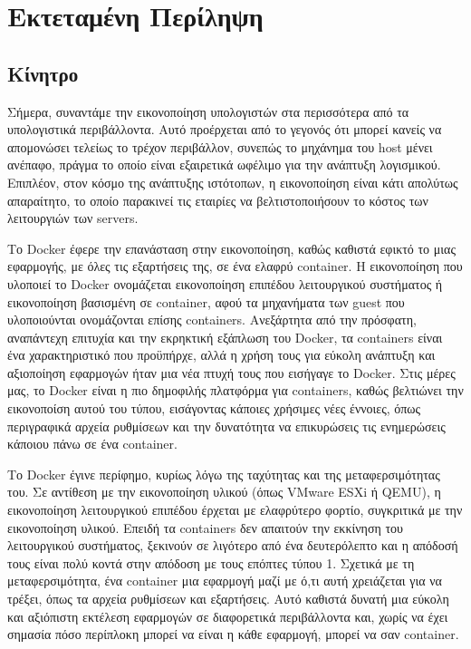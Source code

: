 \chapter*{Εκτεταμένη Περίληψη}
\section*{Κίνητρο}

Σήμερα, συναντάμε την εικονοποίηση υπολογιστών στα περισσότερα από τα υπολογιστικά περιβάλλοντα. Αυτό προέρχεται από το γεγονός ότι μπορεί κανείς να απομονώσει τελείως το τρέχον περιβάλλον, συνεπώς το μηχάνημα του \en host\gr{} μένει ανέπαφο, πράγμα το οποίο είναι εξαιρετικά ωφέλιμο για την ανάπτυξη λογισμικού. Επιπλέον, στον κόσμο της ανάπτυξης ιστότοπων, η εικονοποίηση είναι κάτι απολύτως απαραίτητο, το οποίο παρακινεί τις εταιρίες να βελτιστοποιήσουν το κόστος των λειτουργιών των \en servers\gr{}.

Το \en Docker\gr{} έφερε την επανάσταση στην εικονοποίηση, καθώς καθιστά εφικτό το  μιας εφαρμογής, με όλες τις εξαρτήσεις της, σε ένα ελαφρύ \en container\gr{}. Η εικονοποίηση που υλοποιεί το \en Docker\gr{} ονομάζεται εικονοποίηση επιπέδου λειτουργικού συστήματος ή εικονοποίηση βασισμένη σε \en container\gr{}, αφού τα μηχανήματα των \en guest\gr{} που υλοποιούνται ονομάζονται επίσης \en containers\gr{}. Ανεξάρτητα από την πρόσφατη, αναπάντεχη επιτυχία και την εκρηκτική εξάπλωση του \en Docker\gr{}, τα \en containers\gr{} είναι ένα χαρακτηριστικό που προϋπήρχε, αλλά η χρήση τους για εύκολη ανάπτυξη και αξιοποίηση εφαρμογών ήταν μια νέα πτυχή τους που εισήγαγε το \en Docker\gr. Στις μέρες μας, το \en Docker\gr{} είναι η πιο δημοφιλής πλατφόρμα για \en containers\gr{}, καθώς βελτιώνει την εικονοποίση αυτού του τύπου, εισάγοντας κάποιες χρήσιμες νέες έννοιες, όπως περιγραφικά αρχεία ρυθμίσεων και την δυνατότητα να επικυρώσεις τις ενημερώσεις κάποιου πάνω σε ένα \en container\gr.

Το \en Docker\gr{} έγινε περίφημο, κυρίως λόγω της ταχύτητας και της μεταφερσιμότητας του. Σε αντίθεση με την εικονοποίηση υλικού (όπως \en VMware ESXi\gr{} ή \en QEMU\gr{}), η εικονοποίηση λειτουργικού επιπέδου έρχεται με ελαφρύτερο φορτίο, συγκριτικά με την εικονοποίηση υλικού. Επειδή τα \en containers\gr{} δεν απαιτούν την εκκίνηση του λειτουργικού συστήματος, ξεκινούν σε λιγότερο από ένα δευτερόλεπτο και η απόδοσή τους είναι πολύ κοντά στην απόδοση με τους επόπτες τύπου 1. Σχετικά με τη μεταφερσιμότητα, ένα \en container\gr{}  μια εφαρμογή μαζί με ό,τι αυτή χρειάζεται για να τρέξει, όπως τα αρχεία ρυθμίσεων και εξαρτήσεις. Αυτό καθιστά δυνατή μια εύκολη και αξιόπιστη εκτέλεση εφαρμογών σε διαφορετικά περιβάλλοντα και, χωρίς να έχει σημασία πόσο περίπλοκη μπορεί να είναι η κάθε εφαρμογή, μπορεί να  σαν \en container\gr.
 
